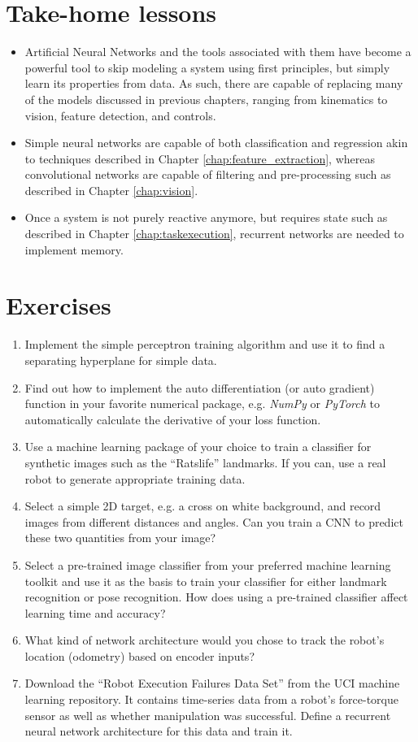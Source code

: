 \section*{Take-home lessons}
\begin{itemize}
\item Artificial Neural Networks and the tools associated with them have become a powerful tool to skip modeling a system using first principles, but simply learn its properties from data. As such, there are capable of replacing many of the models discussed in previous chapters, ranging from kinematics to vision, feature detection, and controls.
\item Simple neural networks are capable of both classification and regression akin to techniques described in Chapter \ref{chap:feature_extraction}, whereas convolutional networks are capable of filtering and pre-processing such as described in Chapter \ref{chap:vision}.
\item Once a system is not purely reactive anymore, but requires state such as described in Chapter \ref{chap:taskexecution}, recurrent networks are needed to implement memory. 
\end{itemize}
\section*{Exercises}
\begin{enumerate}
\item Implement the simple perceptron training algorithm and use it to find a separating hyperplane for simple data.
\item Find out how to implement the auto differentiation (or auto gradient) function in your favorite numerical package, e.g. \textsl{NumPy} or \textsl{PyTorch} to automatically calculate the derivative of your loss function.
\item Use a machine learning package of your choice to train a classifier for synthetic images such as the ``Ratslife'' landmarks. If you can, use a real robot to generate appropriate training data.
\item Select a simple 2D target, e.g. a cross on white background, and record images from different distances and angles. Can you train a CNN to predict these two quantities from your image?
\item Select a pre-trained image classifier from your preferred machine learning toolkit and use it as the basis to train your classifier for either landmark recognition or pose recognition. How does using a pre-trained classifier affect learning time and accuracy?
\item What kind of network architecture would you chose to track the robot's location (odometry) based on encoder inputs?
\item Download the ``Robot Execution Failures Data Set'' from the UCI machine learning repository. It contains time-series data from a robot's force-torque sensor as well as whether manipulation was successful. Define a recurrent neural network architecture for this data and train it.
\end{enumerate}


